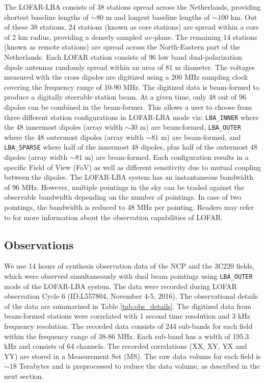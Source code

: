 \documentclass[fleqn,usenatbib]{mnras}
\begin{document}
The LOFAR-LBA consists of 38 stations spread across the Netherlands, providing shortest baseline lengths of $\sim 80$ m and longest baseline lengths of $\sim 100$ km. Out of these 38 stations, 24 stations (known as core stations) are spread within a core of 2 km radius, providing a densely sampled $uv$-plane. The remaining 14 stations (known as remote stations) are spread across the North-Eastern part of the Netherlands. Each LOFAR station consists of 96 low band dual-polarization dipole antennas randomly spread within an area of 81 m diameter. The voltages measured with the cross dipoles are digitized using a 200 MHz sampling clock covering the frequency range of 10-90 MHz. The digitized data is beam-formed to produce a digitally steerable station beam. At a given time, only 48 out of 96 dipoles can be combined in the beam-former. This allows a user to choose from three different station configurations in LOFAR-LBA mode viz: \texttt{LBA\_INNER} where the 48 innermost dipoles (array width $\sim 30$ m) are beam-formed, \texttt{LBA\_OUTER} where the 48 outermost dipoles (array width $\sim 81$ m) are beam-formed, and \texttt{LBA\_SPARSE} where half of the innermost 48 dipoles, plus half of the outermost 48 dipoles (array width $\sim 81$ m) are beam-formed. Each configuration results in a specific Field of View (FoV) as well as different sensitivity due to mutual coupling between the dipoles. The LOFAR-LBA system has an instantaneous bandwidth of 96 MHz. However, multiple pointings in the sky can be traded against the observable bandwidth depending on the number of pointings. In case of two pointings, the bandwidth is reduced to 48 MHz per pointing. Readers may refer to \cite{vanhaarlem2013} for more information about the observation capabilities of LOFAR.

\subsection{Observations}\label{subsec:observations}
We use 14 hours of synthesis observation data of the NCP and the 3C220 fields, which were observed simultaneously with dual beam pointings using \texttt{LBA\_OUTER} mode of the LOFAR-LBA system. The data were recorded during LOFAR observation Cycle 6 (ID:L557804, November 4-5, 2016). The observational details of the data are summarized in Table \ref{tab:obs_details}. The digitized data from beam-formed stations were correlated with 1 second time resolution and 3 kHz frequency resolution. The recorded data consists of 244 sub-bands for each field within the frequency range of 38-86 MHz. Each sub-band has a width of 195.3 kHz and consists of 64 channels. The recorded  correlations (XX, XY, YX and YY) are stored in a Measurement Set (MS). The raw data volume for each field is $\sim18$ Terabytes and is preprocessed to reduce the data volume, as described in the next section. 
\end{document}
